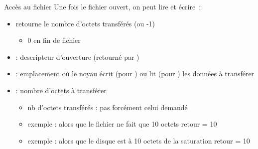 \begin {frame} {Accès au fichier}
    Une fois le fichier ouvert, on peut lire et écrire~:


    \begin {itemize}
	\item retourne le nombre d'octets transférés (ou -1)
	    \begin {itemize}
		\item 0 en fin de fichier
	    \end {itemize}
	\item {} : descripteur d'ouverture (retourné par )
	\item {} : emplacement où le noyau écrit (pour )
	    ou lit (pour ) les données à transférer
	\item {} : nombre d'octets à transférer
	    \begin {itemize}
		\item nb d'octets transférés : pas forcément celui demandé
		\item exemple :  alors
		    que le fichier ne fait que 10 octets
		    \implique retour = 10
		\item exemple :  alors
		    que le disque est à 10 octets de la saturation
		    \implique retour = 10
	    \end {itemize}
    \end {itemize}

\end {frame}

